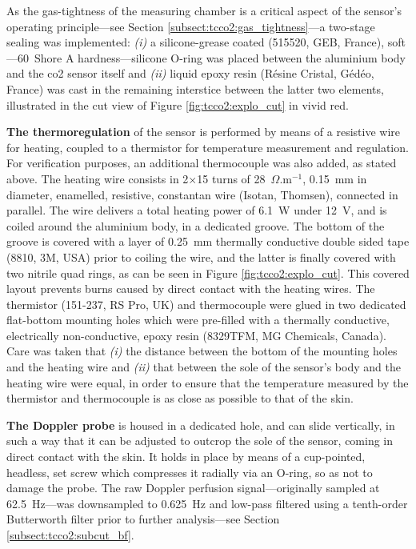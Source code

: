 As the gas-tightness of the measuring chamber is a critical aspect of the sensor's operating principle---see Section \ref{subsect:tcco2:gas_tightness}---a two-stage sealing was implemented: \textit{(i)} a silicone-grease coated (515520, GEB, France), soft---60~Shore A hardness---silicone O-ring was placed between the aluminium body and the \gls{co2} sensor itself and \textit{(ii)} liquid epoxy resin (Résine Cristal, Gédéo, France) was cast in the remaining interstice between the latter two elements, illustrated in the cut view of Figure \ref{fig:tcco2:explo_cut} in vivid red.

\textbf{The thermoregulation} of the sensor is performed by means of a resistive wire for heating, coupled to a thermistor for temperature measurement and regulation. For verification purposes, an additional thermocouple was also added, as stated above. The heating wire consists in 2$\times$15 turns of 28~$\Omega$.m$^{-1}$, 0.15~mm in diameter, enamelled, resistive, constantan wire (Isotan, Thomsen), connected in parallel. The wire delivers a total heating power of 6.1~W under 12~V, and is coiled around the aluminium body, in a dedicated groove. The bottom of the groove is covered with a layer of 0.25~mm thermally conductive double sided tape (8810, 3M, USA) prior to coiling the wire, and the latter is finally covered with two nitrile quad rings, as can be seen in Figure \ref{fig:tcco2:explo_cut}. This covered layout prevents burns caused by direct contact with the heating wires. The thermistor (151-237, RS Pro, UK) and thermocouple were glued in two dedicated flat-bottom mounting holes which were pre-filled with a thermally conductive, electrically non-conductive, epoxy resin (8329TFM, MG Chemicals, Canada). Care was taken that \textit{(i)} the distance between the bottom of the mounting holes and the heating wire and \textit{(ii)} that between the sole of the sensor's body and the heating wire were equal, in order to ensure that the temperature measured by the thermistor and thermocouple is as close as possible to that of the skin.

\textbf{The Doppler probe} is housed in a dedicated hole, and can slide vertically, in such a way that it can be adjusted to outcrop the sole of the sensor, coming in direct contact with the skin. It holds in place by means of a cup-pointed, headless, set screw which compresses it radially via an O-ring, so as not to damage the probe. The raw Doppler perfusion signal---originally sampled at 62.5~Hz---was downsampled to 0.625~Hz and low-pass filtered using a tenth-order Butterworth filter prior to further analysis---see Section \ref{subsect:tcco2:subcut_bf}.


